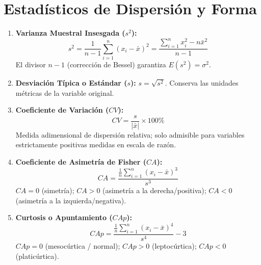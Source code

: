 \documentclass[11pt,a4paper]{report}
\theoremstyle{definition}
\begin{document}
\section{Estadísticos de Dispersión y Forma}
\begin{enumerate}[leftmargin=*]
    \item \textbf{Varianza Muestral Insesgada ($s^2$):}
    \begin{equation}
    s^2 = \frac{1}{n-1} \sum_{i=1}^n (x_i - \bar{x})^2 = \frac{\sum_{i=1}^n x_i^2 - n\bar{x}^2}{n-1}
    \end{equation}
    El divisor $n-1$ (corrección de Bessel) garantiza $E(s^2) = \sigma^2$.
    \item \textbf{Desviación Típica o Estándar ($s$):} $s = \sqrt{s^2}$. Conserva las unidades métricas de la variable original.
    \item \textbf{Coeficiente de Variación ($CV$):}
    \begin{equation}
    CV = \frac{s}{|\bar{x}|} \times 100\%
    \end{equation}
    Medida adimensional de dispersión relativa; solo admisible para variables estrictamente positivas medidas en escala de razón.
    \item \textbf{Coeficiente de Asimetría de Fisher ($CA$):}
    \begin{equation}
    CA = \frac{\frac{1}{n}\sum_{i=1}^n (x_i - \bar{x})^3}{s^3}
    \end{equation}
    $CA = 0$ (simetría); $CA > 0$ (asimetría a la derecha/positiva); $CA < 0$ (asimetría a la izquierda/negativa).
    \item \textbf{Curtosis o Apuntamiento ($CAp$):}
    \begin{equation}
    CAp = \frac{\frac{1}{n}\sum_{i=1}^n (x_i - \bar{x})^4}{s^4} - 3
    \end{equation}
    $CAp = 0$ (mesocúrtica / normal); $CAp > 0$ (leptocúrtica); $CAp < 0$ (platicúrtica).
\end{enumerate}
\end{document}
